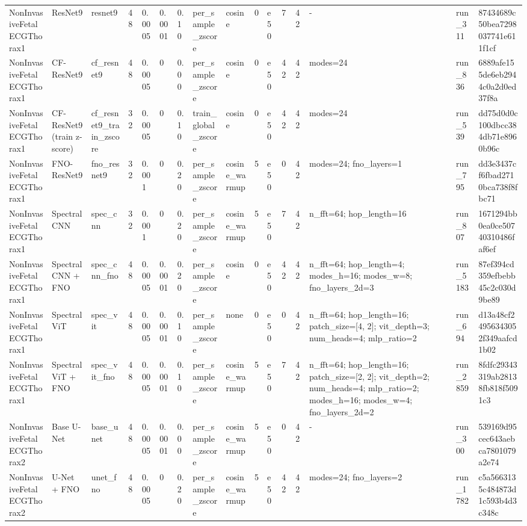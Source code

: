 \begin{longtable}{llllllllllllllll}
NonInvasiveFetalECGThorax1 & ResNet9 & resnet9 & 48 & 0.0005 & 0.0001 & 0.10 & per\_sample\_zscore & cosine & 0 & e50 & 7 & 42 & - & run\_311 & 87434689c50bea7298037741e611f1cf \\
NonInvasiveFetalECGThorax1 & CF-ResNet9 & cf\_resnet9 & 48 & 0.0005 & 0 & 0.00 & per\_sample\_zscore & cosine & 0 & e50 & 42 & 42 & modes=24 & run\_836 & 6889afe155de6eb2944c0a2d0ed37f8a \\
NonInvasiveFetalECGThorax1 & CF-ResNet9 (train z-score) & cf\_resnet9\_train\_zscore & 32 & 0.0005 & 0 & 0.10 & train\_global\_zscore & cosine & 0 & e50 & 42 & 42 & modes=24 & run\_539 & dd75d0d0c100dbcc384db71e8960b96c \\
NonInvasiveFetalECGThorax1 & FNO-ResNet9 & fno\_resnet9 & 32 & 0.001 & 0 & 0.20 & per\_sample\_zscore & cosine\_warmup & 5 & e50 & 0 & 42 & modes=24; fno\_layers=1 & run\_795 & dd3e3437cf6fbad2710bca738f8fbc71 \\
NonInvasiveFetalECGThorax1 & Spectral CNN & spec\_cnn & 32 & 0.001 & 0 & 0.20 & per\_sample\_zscore & cosine\_warmup & 5 & e50 & 7 & 42 & n\_fft=64; hop\_length=16 & run\_807 & 1671294bb0ea0ce50740310486faf6ef \\
NonInvasiveFetalECGThorax1 & Spectral CNN + FNO & spec\_cnn\_fno & 48 & 0.0005 & 0.0001 & 0.20 & per\_sample\_zscore & cosine & 0 & e50 & 42 & 42 & n\_fft=64; hop\_length=4; modes\_h=16; modes\_w=8; fno\_layers\_2d=3 & run\_5183 & 87ef394cd359efbebb45c2c030d9be89 \\
NonInvasiveFetalECGThorax1 & Spectral ViT & spec\_vit & 48 & 0.0005 & 0.0001 & 0.10 & per\_sample\_zscore & none & 0 & e50 & 0 & 42 & n\_fft=64; hop\_length=16; patch\_size=[4, 2]; vit\_depth=3; num\_heads=4; mlp\_ratio=2 & run\_694 & d13a48cf24956343052f349aafcd1b02 \\
NonInvasiveFetalECGThorax1 & Spectral ViT + FNO & spec\_vit\_fno & 48 & 0.0005 & 0.0001 & 0.10 & per\_sample\_zscore & cosine\_warmup & 5 & e50 & 7 & 42 & n\_fft=64; hop\_length=16; patch\_size=[2, 2]; vit\_depth=2; num\_heads=4; mlp\_ratio=2; modes\_h=16; modes\_w=4; fno\_layers\_2d=2 & run\_2859 & 8fdfc29343319ab28138fb818f5091c3 \\
NonInvasiveFetalECGThorax2 & Base U-Net & base\_unet & 48 & 0.0005 & 0.0001 & 0.00 & per\_sample\_zscore & cosine\_warmup & 5 & e50 & 0 & 42 & - & run\_300 & 539169d95cec643aebca7801079a2e74 \\
NonInvasiveFetalECGThorax2 & U-Net + FNO & unet\_fno & 48 & 0.0005 & 0 & 0.20 & per\_sample\_zscore & cosine\_warmup & 5 & e50 & 42 & 42 & modes=24; fno\_layers=2 & run\_1782 & c5a5663135c484873d1c593b4d3c348c \\

\end{longtable}
